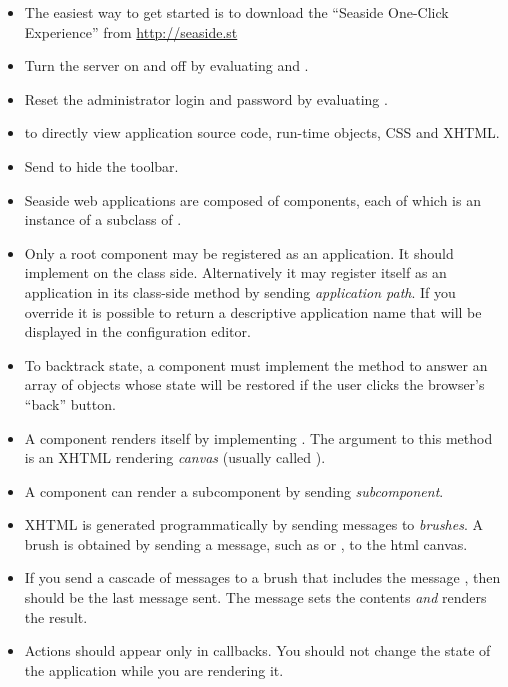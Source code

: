 \documentclass[a4paper,10pt,twoside]{book}
\begin{document}
\begin{itemize}
  \item The easiest way to get started is to download the ``Seaside One-Click Experience'' from \url{http://seaside.st}
  \item Turn the server on and off by evaluating  and .
  \item Reset the administrator login and password by evaluating .
  \item {} to directly view application source code, run-time objects, CSS and XHTML.
  \item Send  to hide the toolbar.
  \item Seaside web applications are composed of components, each of which is an instance of a subclass of .
  \item Only a root component may be registered as an application. It should implement  on the class side. Alternatively it may register itself as an application in its class-side  method by sending  \emph{application path}.
  If you override  it is possible to return a descriptive application name that will be displayed in the configuration editor.
  \item To backtrack state, a component must implement the  method to answer an array of objects whose state will be restored if the user clicks the browser's ``back'' button.
  \item A component renders itself by implementing .
  The argument to this method is an XHTML rendering \emph{canvas} (usually called ).
  \item A component can render a subcomponent by sending  \emph{subcomponent}.
  \item XHTML is generated programmatically by sending messages to \emph{brushes}. A brush is obtained by sending a message, such as  or , to the html canvas.
  \item If you send a cascade of messages to a brush that includes the message , then  should be the last message sent.
  The  message sets the contents \emph{and} renders the result.
  \item Actions should appear only in callbacks.
You should not change the state of the application while you are rendering it.

\end{itemize}
\end{document}

